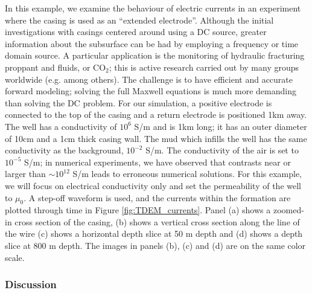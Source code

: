\documentclass[preprint,review,3p,times,onecolumn,authoryear]{elsarticle}
\begin{document}
In this example, we examine the behaviour of electric currents in an experiment where the casing is used as an ``extended electrode''. Although the initial investigations with casings centered around using a DC source, greater information about the subsurface can be had by employing a frequency or time domain source. A particular application is the monitoring of hydraulic fracturing proppant and fluids, or CO$_2$; this is active research carried out by many groups worldwide (e.g. \cite{Hoversten2015, Um2015, Puzyrev2017, Zhang2018} among others). The challenge is to have efficient and accurate forward modeling; solving the full Maxwell equations is much more demanding than solving the DC problem. For our simulation, a positive electrode is connected to the top of the casing and a return electrode is positioned 1km away. The well has a conductivity of $10^6$ S/m and is 1km long; it has an outer diameter of 10cm and a 1cm thick casing wall. The mud which infills the well has the same conductivity as the background, $10^{-2}$ S/m. The conductivity of the air is set to $10^{-5}$ S/m; in numerical experiments, we have observed that contrasts near or larger than $\sim 10^{12}$ S/m leads to erroneous numerical solutions. For this example, we will focus on electrical conductivity only and set the permeability of the well to $\mu_0$. A step-off waveform is used, and the currents within the formation are plotted through time in Figure \ref{fig:TDEM_currents}. Panel (a) shows a zoomed-in cross section of the casing, (b) shows a vertical cross section along the line of the wire (c) shows a horizontal depth slice at 50 m depth and (d) shows a depth slice at 800 m depth. The images in panels (b), (c) and (d) are on the same color scale.

\subsubsection{Discussion}
\end{document}
